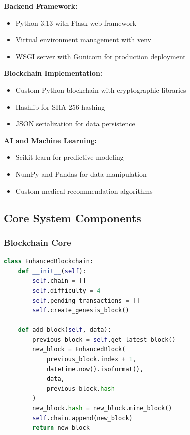\documentclass[conference]{IEEEtran}
\begin{document}
\textbf{Backend Framework:}
\begin{itemize}
    \item Python 3.13 with Flask web framework
    \item Virtual environment management with venv
    \item WSGI server with Gunicorn for production deployment
\end{itemize}

\textbf{Blockchain Implementation:}
\begin{itemize}
    \item Custom Python blockchain with cryptographic libraries
    \item Hashlib for SHA-256 hashing
    \item JSON serialization for data persistence
\end{itemize}

\textbf{AI and Machine Learning:}
\begin{itemize}
    \item Scikit-learn for predictive modeling
    \item NumPy and Pandas for data manipulation
    \item Custom medical recommendation algorithms
\end{itemize}

\subsection{Core System Components}

\subsubsection{Blockchain Core}

\begin{lstlisting}[language=Python, caption=Enhanced Blockchain Class]
class EnhancedBlockchain:
    def __init__(self):
        self.chain = []
        self.difficulty = 4
        self.pending_transactions = []
        self.create_genesis_block()
    
    def add_block(self, data):
        previous_block = self.get_latest_block()
        new_block = EnhancedBlock(
            previous_block.index + 1,
            datetime.now().isoformat(),
            data,
            previous_block.hash
        )
        new_block.hash = new_block.mine_block()
        self.chain.append(new_block)
        return new_block
\end{lstlisting}
\end{document}
